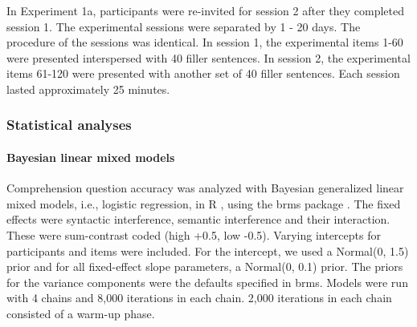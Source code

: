 \documentclass[review,preprint,12pt,authoryear,floatsintext]{elsarticle}
\begin{document}
In Experiment 1a, participants were re-invited for session 2 after they completed session 1. The experimental sessions were separated by 1 - 20 days. The procedure of the sessions was identical. In session 1, the experimental items 1-60 were presented interspersed with 40 filler sentences. In session 2, the experimental items 61-120 were presented with another set of 40 filler sentences. {}\label{fillers} Each session lasted approximately 25 minutes.

\subsubsection*{Statistical analyses}

\paragraph{Bayesian linear mixed models}
Comprehension question accuracy was analyzed with Bayesian generalized linear mixed models, i.e., logistic regression, in R \citep{r}, using the brms package \citep{brms}. The fixed effects were syntactic interference, semantic interference and their interaction. These were sum-contrast coded (high +0.5, low -0.5). Varying intercepts for participants and items were included. For the intercept, we used a Normal(0, 1.5) prior and  for all fixed-effect slope parameters, a Normal(0, 0.1) prior. The priors for the variance components were the defaults specified in brms. Models were run with 4 chains and 8,000 iterations in each chain. 2,000 iterations in each chain consisted of a warm-up phase. 
\end{document}
